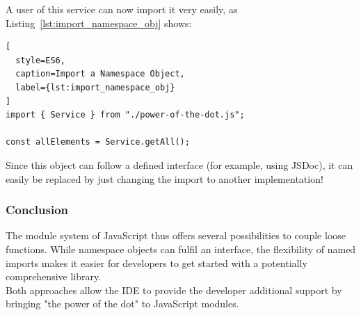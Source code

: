 A user of this service can now import it very easily, as
Listing~\ref{lst:import_namespace_obj} shows:

\begin{lstlisting}[
  style=ES6,
  caption=Import a Namespace Object,
  label={lst:import_namespace_obj}
]
import { Service } from "./power-of-the-dot.js";

const allElements = Service.getAll();
\end{lstlisting}

Since this object can follow a defined interface (for example, using JSDoc), it
can easily be replaced by just changing the import to another implementation!

\subsubsection{Conclusion} %
\label{subsub:Conclusion}
The module system of JavaScript thus offers several possibilities to couple
loose functions. While namespace objects can fulfil an interface, the
flexibility of named imports makes it easier for developers to get started with
a potentially comprehensive library. \\ 
Both approaches allow the IDE to provide the developer additional support by
bringing "the power of the dot" to JavaScript modules.

